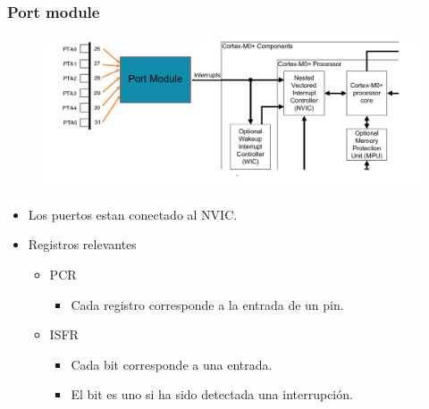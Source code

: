 \documentclass[10.5pt,scale=1.0,t,aspectratio=169,hyperref={pdfpagelabels=false}]{beamer}
\begin{document}
\begin{frame}
	\frametitle{Port module}
	\begin{figure}
		\centering
		\includegraphics[scale=0.5]{06_PortInterrupt}
	\end{figure}
	\begin{itemize}
		\item Los puertos estan conectado al NVIC.
		\item Registros relevantes
		\begin{itemize}
			\item PCR
			\begin{itemize}
				\item Cada registro corresponde a la entrada de un pin.
			\end{itemize}
			\item ISFR
			\begin{itemize}
				\item Cada bit corresponde a una entrada.
				\item El bit es uno si ha sido detectada una interrupción. 
			\end{itemize}
		\end{itemize}
	\end{itemize}
\end{frame}
\end{document}
